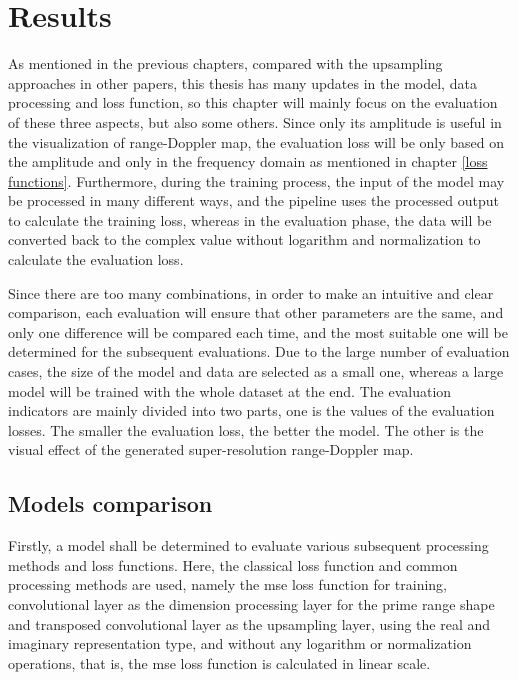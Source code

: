 \chapter{Results} \label{results}
As mentioned in the previous chapters, compared with the upsampling approaches in other papers, this thesis has many updates in the model, data processing and loss function, so this chapter will mainly focus on the evaluation of these three aspects, but also some others. Since only its amplitude is useful in the visualization of range-Doppler map, the evaluation loss will be only based on the amplitude and only in the frequency domain as mentioned in chapter \ref{loss functions}. Furthermore, during the training process, the input of the model may be processed in many different ways, and the pipeline uses the processed output to calculate the training loss, whereas in the evaluation phase, the data will be converted back to the complex value without logarithm and normalization to calculate the evaluation loss.

Since there are too many combinations, in order to make an intuitive and clear comparison, each evaluation will ensure that other parameters are the same, and only one difference will be compared each time, and the most suitable one will be determined for the subsequent evaluations. Due to the large number of evaluation cases, the size of the model and data are selected as a small one, whereas a large model will be trained with the whole dataset at the end. The evaluation indicators are mainly divided into two parts, one is the values of the evaluation losses. The smaller the evaluation loss, the better the model. The other is the visual effect of the generated super-resolution range-Doppler map.

\section{Models comparison} \label{models comparisons}

Firstly, a model shall be determined to evaluate various subsequent processing methods and loss functions. Here, the classical loss function and common processing methods are used, namely the \gls{mse} loss function for training, convolutional layer as the dimension processing layer for the prime range shape and transposed convolutional layer as the upsampling layer, using the real and imaginary representation type, and without any logarithm or normalization operations, that is, the \gls{mse} loss function is calculated in linear scale.

